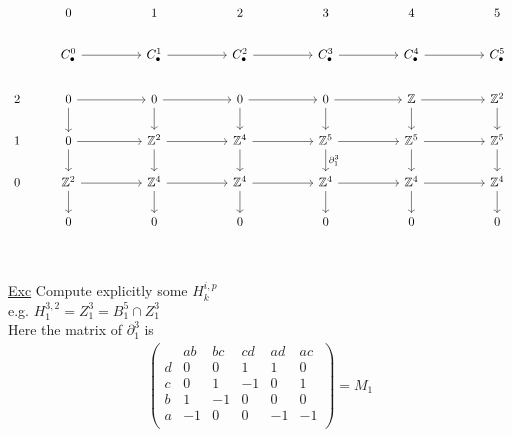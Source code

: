 \documentclass[11pt,a4paper]{report}
\begin{document}
              \\
              \[
                \begin{tikzcd}[ampersand replacement=\&, sep=normal]
                  \& 0     \&\& 1    \&\& 2     \&\& 3     \&\& 4     \&\& 5\\
                  \& C_\bullet^0 \arrow[rr] \&\& C_\bullet^1 \arrow[rr] \&\& C_\bullet^2 \arrow[rr] \&\& C_\bullet^3 \arrow[rr] \&\& C_\bullet^4 \arrow[rr] \&\& C_\bullet^5\\
                  2 \& 0 \arrow[d]  \arrow[rr]           \&\& 0 \arrow[d]  \arrow[rr]           \&\& 0 \arrow[d]  \arrow[rr]           \&\& 0 \arrow[d]  \arrow[rr]           \&\& \mathbb{Z} \arrow[rr] \arrow[d]  \&\& \mathbb{Z}^2 \arrow[d]\\
                  1 \& 0 \arrow[d]  \arrow[rr]           \&\& \mathbb{Z}^2 \arrow[rr] \arrow[d] \&\& \mathbb{Z}^4 \arrow[rr] \arrow[d] \&\& \mathbb{Z}^5 \arrow[rr] \arrow[d,"\partial_1^3"] \&\& \mathbb{Z}^5 \arrow[rr] \arrow[d] \&\& \mathbb{Z}^5 \arrow[d]\\
                  0 \& \mathbb{Z}^2 \arrow[rr] \arrow[d] \&\& \mathbb{Z}^4 \arrow[rr] \arrow[d] \&\& \mathbb{Z}^4 \arrow[rr] \arrow[d] \&\& \mathbb{Z}^4 \arrow[rr] \arrow[d] \&\& \mathbb{Z}^4 \arrow[rr] \arrow[d] \&\& \mathbb{Z}^4 \arrow[d]\\
                  \& 0 \&\& 0 \&\& 0 \&\& 0 \&\& 0 \&\& 0\\
                \end{tikzcd}
              \]
              \\
              \underline{Exc} Compute explicitly some $H_k^{i,p}$\\
              e.g. $H_1^{3,2} = Z_1^3 = B_1^5 \cap Z_1^3$\\
              Here the matrix of $\partial_1^3$ is\\
              \begin{align*}
                \left(\begin{array}{c|ccccc}
                        &ab&bc&cd&ad&ac\\\hline
                        d&0&0&1&1&0\\
                        c&0&1&-1&0&1\\
                        b&1&-1&0&0&0\\
                        a&-1&0&0&-1&-1\\
                      \end{array}\right) = M_1
              \end{align*}
\end{document}
